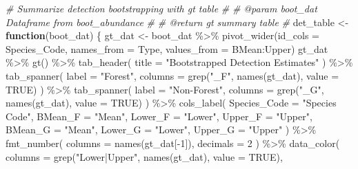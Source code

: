\documentclass[
]{article}
\newenvironment{Shaded}{\begin{snugshade}}{\end{snugshade}}
\newcommand{\AttributeTok}[1]{\textcolor[rgb]{0.77,0.63,0.00}{#1}}
\newcommand{\CommentTok}[1]{\textcolor[rgb]{0.56,0.35,0.01}{\textit{#1}}}
\newcommand{\ConstantTok}[1]{\textcolor[rgb]{0.00,0.00,0.00}{#1}}
\newcommand{\ControlFlowTok}[1]{\textcolor[rgb]{0.13,0.29,0.53}{\textbf{#1}}}
\newcommand{\DecValTok}[1]{\textcolor[rgb]{0.00,0.00,0.81}{#1}}
\newcommand{\FunctionTok}[1]{\textcolor[rgb]{0.00,0.00,0.00}{#1}}
\newcommand{\NormalTok}[1]{#1}
\newcommand{\OtherTok}[1]{\textcolor[rgb]{0.56,0.35,0.01}{#1}}
\newcommand{\SpecialCharTok}[1]{\textcolor[rgb]{0.00,0.00,0.00}{#1}}
\newcommand{\StringTok}[1]{\textcolor[rgb]{0.31,0.60,0.02}{#1}}
\begin{document}
\begin{Shaded}
\begin{Highlighting}[]
\CommentTok{\# Summarize detection bootstrapping with gt table}
\CommentTok{\#}
\CommentTok{\# @param boot\_dat Dataframe from boot\_abundance}
\CommentTok{\#}
\CommentTok{\# @return gt summary table}
\CommentTok{\#}
\NormalTok{det\_table }\OtherTok{\textless{}{-}} \ControlFlowTok{function}\NormalTok{(boot\_dat) \{}
\NormalTok{  gt\_dat }\OtherTok{\textless{}{-}}\NormalTok{ boot\_dat }\SpecialCharTok{\%\textgreater{}\%} 
              \FunctionTok{pivot\_wider}\NormalTok{(}\AttributeTok{id\_cols =}\NormalTok{ Species\_Code,}
                          \AttributeTok{names\_from =}\NormalTok{ Type,}
                          \AttributeTok{values\_from =}\NormalTok{ BMean}\SpecialCharTok{:}\NormalTok{Upper) }
\NormalTok{  gt\_dat }\SpecialCharTok{\%\textgreater{}\%}
    \FunctionTok{gt}\NormalTok{() }\SpecialCharTok{\%\textgreater{}\%}
    \FunctionTok{tab\_header}\NormalTok{( }
      \AttributeTok{title =} \StringTok{"Bootstrapped Detection Estimates"}
\NormalTok{    ) }\SpecialCharTok{\%\textgreater{}\%}
    \FunctionTok{tab\_spanner}\NormalTok{(}
      \AttributeTok{label =} \StringTok{"Forest"}\NormalTok{,}
      \AttributeTok{columns =} \FunctionTok{grep}\NormalTok{(}\StringTok{"\_F"}\NormalTok{, }\FunctionTok{names}\NormalTok{(gt\_dat), }\AttributeTok{value =} \ConstantTok{TRUE}\NormalTok{)}
\NormalTok{    ) }\SpecialCharTok{\%\textgreater{}\%}
    \FunctionTok{tab\_spanner}\NormalTok{(}
      \AttributeTok{label =} \StringTok{"Non{-}Forest"}\NormalTok{,}
      \AttributeTok{columns =} \FunctionTok{grep}\NormalTok{(}\StringTok{"\_G"}\NormalTok{, }\FunctionTok{names}\NormalTok{(gt\_dat), }\AttributeTok{value =} \ConstantTok{TRUE}\NormalTok{)}
\NormalTok{    ) }\SpecialCharTok{\%\textgreater{}\%}
    \FunctionTok{cols\_label}\NormalTok{(}
      \AttributeTok{Species\_Code =} \StringTok{"Species Code"}\NormalTok{,}
      \AttributeTok{BMean\_F =} \StringTok{"Mean"}\NormalTok{,}
      \AttributeTok{Lower\_F =} \StringTok{"Lower"}\NormalTok{,}
      \AttributeTok{Upper\_F =} \StringTok{"Upper"}\NormalTok{,}
      \AttributeTok{BMean\_G =} \StringTok{"Mean"}\NormalTok{,}
      \AttributeTok{Lower\_G =} \StringTok{"Lower"}\NormalTok{,}
      \AttributeTok{Upper\_G =} \StringTok{"Upper"}
\NormalTok{    ) }\SpecialCharTok{\%\textgreater{}\%}
    \FunctionTok{fmt\_number}\NormalTok{(}
      \AttributeTok{columns =} \FunctionTok{names}\NormalTok{(gt\_dat[}\SpecialCharTok{{-}}\DecValTok{1}\NormalTok{]),}
      \AttributeTok{decimals =} \DecValTok{2}
\NormalTok{    ) }\SpecialCharTok{\%\textgreater{}\%}
    \FunctionTok{data\_color}\NormalTok{(}
      \AttributeTok{columns =} \FunctionTok{grep}\NormalTok{(}\StringTok{"Lower|Upper"}\NormalTok{, }\FunctionTok{names}\NormalTok{(gt\_dat), }\AttributeTok{value =} \ConstantTok{TRUE}\NormalTok{),}

\end{Highlighting}
\end{Shaded}
\end{document}
